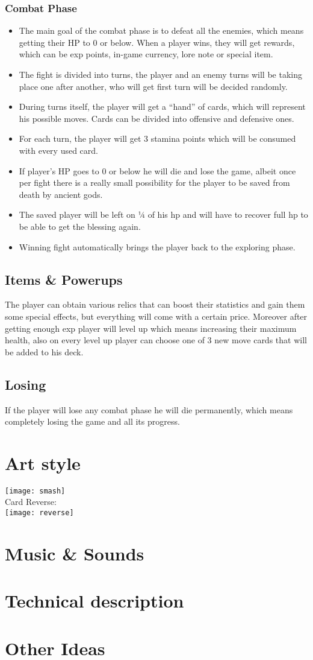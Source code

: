 \documentclass[a4paper,11pt]{article}
\begin{document}
\subsubsection{Combat Phase}
\begin{itemize}
\item The main goal of the combat phase is to defeat all the enemies, which means getting their HP to 0 or below. When a player wins, they will get rewards, which can be exp points, in-game currency, lore note or special item.
\item The fight is divided into turns, the player and an enemy turns will be taking place one after another, who will get first turn will be decided randomly.
\item During turns itself, the player will get a “hand” of cards, which will represent his possible moves. Cards can be divided into offensive and defensive ones. 
\item For each turn, the player will get 3 stamina points which will be consumed with every used card.
\item If player’s HP goes to 0 or below he will die and lose the game, albeit once per fight there is a really small possibility for the player to be saved from death by ancient gods.
\item The saved player will be left on ¼ of his hp and will have to recover full hp to be able to get the blessing again.
\item Winning fight automatically brings the player back to the exploring phase.

\end{itemize}
\subsection{Items \&  Powerups}
The player can obtain various relics that can boost their statistics and gain them some special effects, but everything will come with a certain price. Moreover after getting enough exp player will level up which means increasing their maximum health, also on every level up player can choose one of 3 new move cards that will be added to his deck.
\subsection{Losing}
If the player will lose any combat phase he will die permanently, which means completely losing the game and all its progress. 
\section{Art style}
\texttt{[image: smash]}\\
Card Reverse:\\
\texttt{[image: reverse]}
\section{Music \& Sounds}
\section{Technical description}
\section{Other Ideas}
\end{document}
